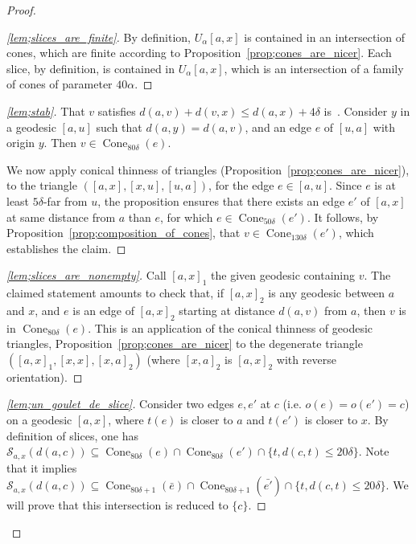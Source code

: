 \documentclass[11pt]{article}
\theoremstyle{definition}
\numberwithin{equation}{section}
\DeclareMathOperator{\Co}{Cone}
\newenvironment*{step}{\begin{proof}}{\let\qed\relax\end{proof}}
\newenvironment*{laststep}{\begin{proof}}{\end{proof}}
\begin{document}
\begin{proof}
\begin{step}[\eqref{lem;slices_are_finite}]
By definition, $U_{\alpha}[a,x]$ is contained in an intersection of cones, which are finite according to Proposition~\ref{prop;cones_are_nicer}. Each slice, by definition, is contained in $U_{\alpha}[a,x]$, which is an intersection of a family of cones of parameter $40\alpha$.
\end{step}

\begin{step}[\eqref{lem;stab}]
That $v$ satisfies $d(a,v) + d(v,x) \leq d(a,x)+4\delta$ is~\cite[3.4]{AL}. Consider $y$ in a geodesic $[a,u]$ such that $d(a,y) = d(a,v)$, and an edge $e$ of $[u,a]$ with origin $y$. Then $v\in \Co_{80\delta}(e)$.

We now apply conical thinness of triangles (Proposition~\ref{prop;cones_are_nicer}), to the triangle $([a,x], [x,u], [u,a])$, for the edge $e\in [a,u]$. Since $e$ is at least $5\delta$-far from $u$, the proposition ensures that there exists an edge $e'$ of $[a,x]$ at same distance from $a$ than $e$, for which $e\in \Co_{50\delta} (e')$. It follows, by Proposition~\ref{prop;composition_of_cones}, that $v\in \Co_{130\delta} (e')$, which establishes the claim.
\end{step}

\begin{step}[\eqref{lem;slices_are_nonempty}]
Call $[a,x]_1$ the given geodesic containing $v$. The claimed statement amounts to check that, if $[a,x]_2$ is any geodesic between $a$ and $x$, and $e$ is an edge of $ [a,x]_2$ starting at distance $d(a,v)$ from $a$, then $v$ is in $\Co_{80\delta}(e)$. This is an application of the conical thinness of geodesic triangles, Proposition~\ref{prop;cones_are_nicer} to the degenerate triangle $([a,x]_1, [x,x], [x,a]_2)$ (where $[x,a]_2$ is $[a,x]_2$ with reverse orientation).
\end{step}

\begin{laststep}[\eqref{lem;un_goulet_de_slice}]
Consider two edges $e,e'$ at $c$ (i.e. $o(e)=o(e')=c$) on a geodesic $[a,x]$, where $t(e) $ is closer to $a$ and $t(e')$ is closer to $x$. By definition of slices, one has $ \mathcal{S}_{a,x} (d(a,c)) \subseteq \Co_{80\delta}(e) \cap \Co_{80\delta}(e') \cap \{t, d(c,t)\leq 20\delta \}$. Note that it implies $ \mathcal{S}_{a,x} (d(a,c)) \subseteq \Co_{80\delta+1}(\bar{e}) \cap \Co_{80\delta+1}(\bar{e'}) \cap \{t, d(c,t)\leq 20\delta\}$. We will prove that this intersection is reduced to $\{c\}$.


\end{laststep}
\end{proof}
\end{document}
